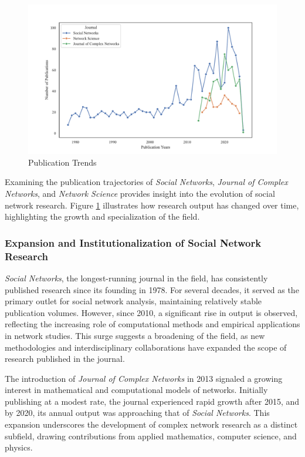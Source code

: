 \documentclass[twocolumn]{article}
\begin{document}
	\begin{figure}[htbp]
		\centering
		\caption{Publication Trends}\label{fig.fig1}
		\includegraphics[width=\columnwidth]{images/Record Count Proportion.pdf}
	\end{figure}
	
	Examining the publication trajectories of \textit{Social Networks}, \textit{Journal of Complex Networks}, and \textit{Network Science} provides insight into the evolution of social network research. Figure \ref{fig.fig1} illustrates how research output has changed over time, highlighting the growth and specialization of the field.
	
	\subsubsection*{Expansion and Institutionalization of Social Network Research}
	
	\textit{Social Networks}, the longest-running journal in the field, has consistently published research since its founding in 1978. For several decades, it served as the primary outlet for social network analysis, maintaining relatively stable publication volumes. However, since 2010, a significant rise in output is observed, reflecting the increasing role of computational methods and empirical applications in network studies. This surge suggests a broadening of the field, as new methodologies and interdisciplinary collaborations have expanded the scope of research published in the journal.
	
	The introduction of \textit{Journal of Complex Networks} in 2013 signaled a growing interest in mathematical and computational models of networks. Initially publishing at a modest rate, the journal experienced rapid growth after 2015, and by 2020, its annual output was approaching that of \textit{Social Networks}. This expansion underscores the development of complex network research as a distinct subfield, drawing contributions from applied mathematics, computer science, and physics.
	
\end{document}
